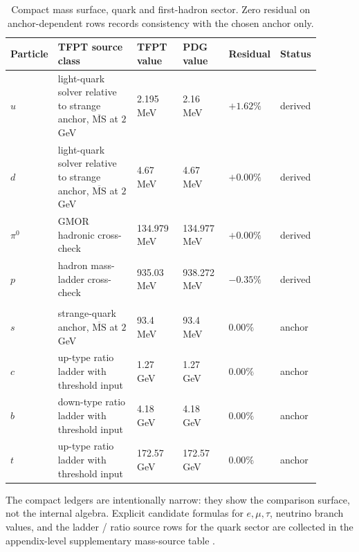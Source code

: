 \begin{table}[p]
\centering
\scriptsize
\setlength{\tabcolsep}{3pt}
\begin{tabularx}{\linewidth}{@{}>{\raggedright\arraybackslash}p{0.10\linewidth}>{\raggedright\arraybackslash}p{0.27\linewidth}>{\raggedleft\arraybackslash}p{0.15\linewidth}>{\raggedleft\arraybackslash}p{0.15\linewidth}>{\raggedleft\arraybackslash}p{0.10\linewidth}>{\raggedright\arraybackslash}p{0.12\linewidth}@{}}
\toprule
Particle & TFPT source class & TFPT value & PDG value & Residual & Status \\
\midrule
$u$ & light-quark solver relative to strange anchor, $\overline{\mathrm{MS}}$ at $2$ GeV & \num{2.195} MeV & \num{2.16} MeV & $+1.62\%$ & derived \\
$d$ & light-quark solver relative to strange anchor, $\overline{\mathrm{MS}}$ at $2$ GeV & \num{4.67} MeV & \num{4.67} MeV & $+0.00\%$ & derived \\
$\pi^0$ & GMOR hadronic cross-check & \num{134.979} MeV & \num{134.977} MeV & $+0.00\%$ & derived \\
$p$ & hadron mass-ladder cross-check & \num{935.03} MeV & \num{938.272} MeV & $-0.35\%$ & derived \\
\midrule
\multicolumn{6}{@{}l}{\textit{Calibration surface (anchor-dependent):}} \\
$s$ & strange-quark anchor, $\overline{\mathrm{MS}}$ at $2$ GeV & \num{93.4} MeV & \num{93.4} MeV & $0.00\%$ & anchor \\
$c$ & up-type ratio ladder with threshold input & \num{1.27} GeV & \num{1.27} GeV & $0.00\%$ & anchor \\
$b$ & down-type ratio ladder with threshold input & \num{4.18} GeV & \num{4.18} GeV & $0.00\%$ & anchor \\
$t$ & up-type ratio ladder with threshold input & \num{172.57} GeV & \num{172.57} GeV & $0.00\%$ & anchor \\
\bottomrule
\end{tabularx}
\caption{Compact mass surface, quark and first-hadron sector. Zero residual on anchor-dependent rows records consistency with the chosen anchor only.}
\label{tab:sm-mass-ledger-quarks}
\end{table}

The compact ledgers are intentionally narrow: they show the comparison surface, not the internal algebra. Explicit candidate formulas for $e,\mu,\tau$, neutrino branch values, and the ladder / ratio source rows for the quark sector are collected in the appendix-level supplementary mass-source table .

